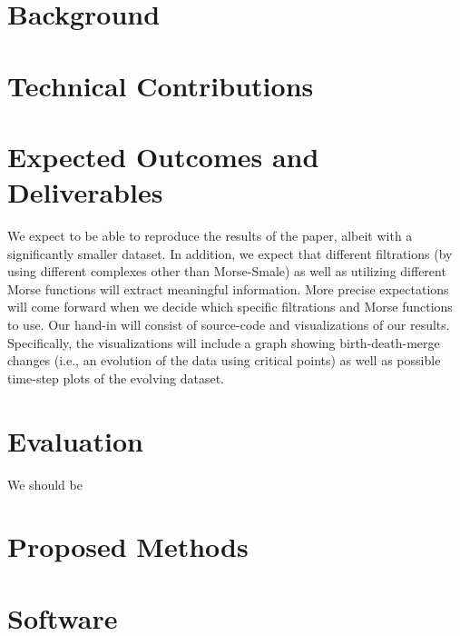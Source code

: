 \documentclass[12pt, fullpage,letterpaper]{article}
\begin{document}
	\section*{\normalfont Background} 
	
	  
	\section*{\normalfont Technical Contributions} 
	
	
	\section*{\normalfont Expected Outcomes and Deliverables}  
We expect to be able to reproduce the results of the paper, albeit with a significantly smaller dataset. In addition, we expect that different filtrations (by using different complexes other than Morse-Smale) as well as utilizing different Morse functions will extract meaningful information. More precise expectations will come forward when we decide which specific filtrations and  Morse functions to use. Our hand-in will consist of source-code and visualizations of our results. Specifically, the visualizations will include a graph showing birth-death-merge changes (i.e., an evolution of the data using critical points) as well as possible time-step plots of the evolving dataset.
	
	\section*{\normalfont Evaluation}  
	We should be 
	
	
	\section*{\normalfont Proposed Methods}  


	\section*{\normalfont Software}  
	
\end{document}
